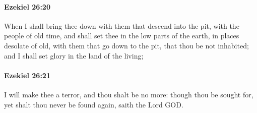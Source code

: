 		\paragraph{Ezekiel 26:20} %
			\label{EZEKIEL-26-20}

			When I shall bring thee down with them that descend into the pit, with the people of old time, and shall set thee in the low parts of the earth, in places desolate of old, with them that go down to the pit, that thou be not inhabited; and I shall set glory in the land of the living;


		\paragraph{Ezekiel 26:21} %
			\label{EZEKIEL-26-21}

			I will make thee a terror, and thou shalt be no more: though thou be sought for, yet shalt thou never be found again, saith the Lord GOD.

